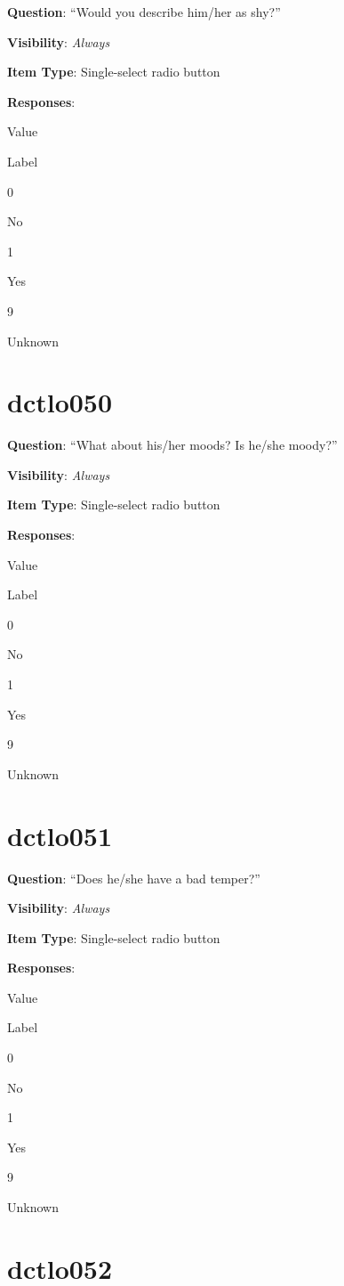 \documentclass[]{book}
\begin{document}
\textbf{Question}: ``Would you describe him/her as shy?''

\textbf{Visibility}: \emph{Always}

\textbf{Item Type}: Single-select radio button

\textbf{Responses}:

Value

Label

0

No

1

Yes

9

Unknown

\hypertarget{dctlo050}{%
\section{dctlo050}\label{dctlo050}}

\textbf{Question}: ``What about his/her moods? Is he/she moody?''

\textbf{Visibility}: \emph{Always}

\textbf{Item Type}: Single-select radio button

\textbf{Responses}:

Value

Label

0

No

1

Yes

9

Unknown

\hypertarget{dctlo051}{%
\section{dctlo051}\label{dctlo051}}

\textbf{Question}: ``Does he/she have a bad temper?''

\textbf{Visibility}: \emph{Always}

\textbf{Item Type}: Single-select radio button

\textbf{Responses}:

Value

Label

0

No

1

Yes

9

Unknown

\hypertarget{dctlo052}{%
\section{dctlo052}\label{dctlo052}}
\end{document}

